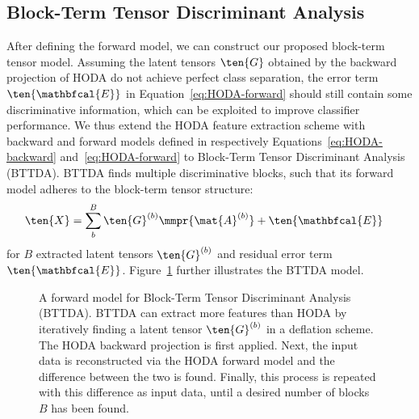 \subsection{Block-Term Tensor Discriminant Analysis}
After defining the forward model, we can construct our proposed block-term
tensor model.
Assuming the latent tensors $\ten{G}$
obtained by the backward projection of HODA do not achieve perfect
class separation, the error term $\ten{\mathbfcal{E}}$ in
Equation~\ref{eq:HODA-forward} should still contain some discriminative
information, which can be exploited to improve classifier
performance.
We thus extend the HODA feature extraction scheme with backward and
forward models defined in respectively Equations~\ref{eq:HODA-backward}
and~\ref{eq:HODA-forward} to Block-Term Tensor Discriminant Analysis
(BTTDA).
BTTDA finds multiple discriminative blocks, such that its forward
model adheres to the block-term tensor structure:
\begin{align}
	\ten{X} & = \sum_b^B\ten{G}^{(b)}\mmpr{\mat{A}^{(b)}} + \ten{\mathbfcal{E}}
	\label{eq:BTTDA-forward}
\end{align}
for $B$ extracted latent tensors $\ten{G}^{(b)}$ and residual error term
$\ten{\mathbfcal{E}}$.
Figure~\ref{fig:BTTDA} further illustrates the BTTDA model.
\begin{figure}[t]
	\centering
	
  \caption[A forward model for \ac{bttda}.]{A forward model for Block-Term Tensor Discriminant Analysis
		(BTTDA). BTTDA can extract more features
		than HODA by iteratively finding a latent tensor $\ten{G}^{(b)}$ in a
		deflation scheme.
		The HODA backward projection is first applied. Next, the
		input data is reconstructed via the HODA forward model and the
		difference between the two is found.
		Finally, this process is repeated with this difference as input data, until a
		desired number of blocks $B$ has been found.}
	\label{fig:BTTDA}
\end{figure}

